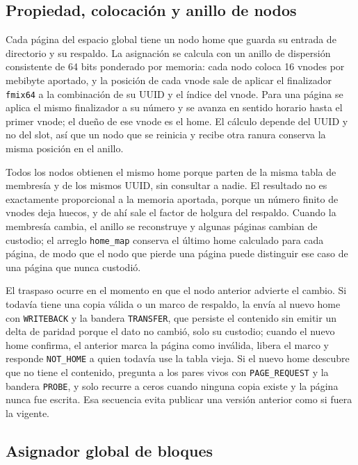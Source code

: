\subsection{Propiedad, colocación y anillo de nodos}\label{sec:propiedad-anillo}

Cada página del espacio global tiene un nodo home que guarda su entrada de directorio y su respaldo. La asignación se calcula con un anillo de dispersión consistente de 64 bits ponderado por memoria: cada nodo coloca 16 vnodes por mebibyte aportado, y la posición de cada vnode sale de aplicar el finalizador \texttt{fmix64} a la combinación de su UUID y el índice del vnode. Para una página se aplica el mismo finalizador a su número y se avanza en sentido horario hasta el primer vnode; el dueño de ese vnode es el home. El cálculo depende del UUID y no del slot, así que un nodo que se reinicia y recibe otra ranura conserva la misma posición en el anillo.

Todos los nodos obtienen el mismo home porque parten de la misma tabla de membresía y de los mismos UUID, sin consultar a nadie. El resultado no es exactamente proporcional a la memoria aportada, porque un número finito de vnodes deja huecos, y de ahí sale el factor de holgura del respaldo. Cuando la membresía cambia, el anillo se reconstruye y algunas páginas cambian de custodio; el arreglo \texttt{home\_map} conserva el último home calculado para cada página, de modo que el nodo que pierde una página puede distinguir ese caso de una página que nunca custodió.

El traspaso ocurre en el momento en que el nodo anterior advierte el cambio. Si todavía tiene una copia válida o un marco de respaldo, la envía al nuevo home con \texttt{WRITEBACK} y la bandera \texttt{TRANSFER}, que persiste el contenido sin emitir un delta de paridad porque el dato no cambió, solo su custodio; cuando el nuevo home confirma, el anterior marca la página como inválida, libera el marco y responde \texttt{NOT\_HOME} a quien todavía use la tabla vieja. Si el nuevo home descubre que no tiene el contenido, pregunta a los pares vivos con \texttt{PAGE\_REQUEST} y la bandera \texttt{PROBE}, y solo recurre a ceros cuando ninguna copia existe y la página nunca fue escrita. Esa secuencia evita publicar una versión anterior como si fuera la vigente.

\subsection{Asignador global de bloques}\label{sec:asignador-global}

